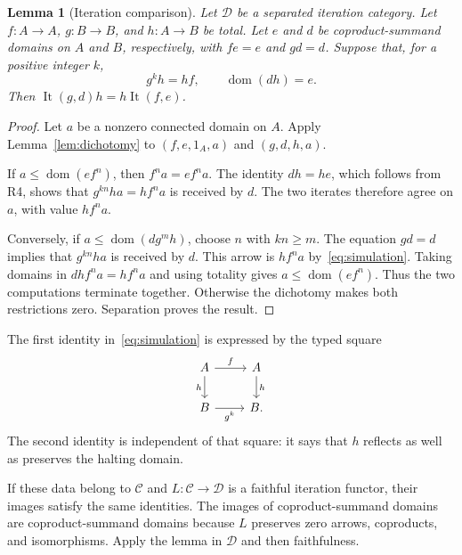 \documentclass[11pt]{article}
\newtheorem{lemma}[theorem]{Lemma}
\newcommand{\C}{\mathcal C}\newcommand{\D}{\mathcal D}\newcommand{\B}{\mathcal B}
\newcommand{\dom}{\operatorname{dom}}\newcommand{\ran}{\operatorname{ran}}
\newcommand{\It}{\operatorname{It}}\newcommand{\Tur}{\operatorname{Tur}}
\begin{document}
\begin{lemma}[Iteration comparison]\label{lem:simulation}
Let $\D$ be a separated iteration category. Let $f:A\to A$, $g:B\to B$, and $h:A\to B$ be total. Let $e$ and $d$ be coproduct-summand domains on $A$ and $B$, respectively, with $fe=e$ and $gd=d$. Suppose that, for a positive integer $k$,
\begin{equation}\label{eq:simulation}
g^kh=hf,\qquad \dom(dh)=e.
\end{equation}
Then $\It(g,d)h=h\It(f,e)$.
\end{lemma}
\begin{proof}
Let $a$ be a nonzero connected domain on $A$. Apply Lemma~\ref{lem:dichotomy} to $(f,e,1_A,a)$ and $(g,d,h,a)$.

If $a\leq\dom(ef^n)$, then $f^na=ef^na$. The identity $dh=he$, which follows from R4, shows that $g^{kn}ha=hf^na$ is received by $d$. The two iterates therefore agree on $a$, with value $hf^na$.

Conversely, if $a\leq\dom(dg^mh)$, choose $n$ with $kn\geq m$. The equation $gd=d$ implies that $g^{kn}ha$ is received by $d$. This arrow is $hf^na$ by~\eqref{eq:simulation}. Taking domains in $dhf^na=hf^na$ and using totality gives $a\leq\dom(ef^n)$. Thus the two computations terminate together. Otherwise the dichotomy makes both restrictions zero. Separation proves the result.
\end{proof}

The first identity in~\eqref{eq:simulation} is expressed by the typed square
\[
\begin{tikzcd}
A\arrow[r,"f"]\arrow[d,"h"']&A\arrow[d,"h"]\\
B\arrow[r,"g^k"']&B.
\end{tikzcd}
\]
The second identity is independent of that square: it says that $h$ reflects as well as preserves the halting domain.

If these data belong to $\C$ and $L:\C\to\D$ is a faithful iteration functor, their images satisfy the same identities. The images of coproduct-summand domains are coproduct-summand domains because $L$ preserves zero arrows, coproducts, and isomorphisms. Apply the lemma in $\D$ and then faithfulness.
\end{document}
